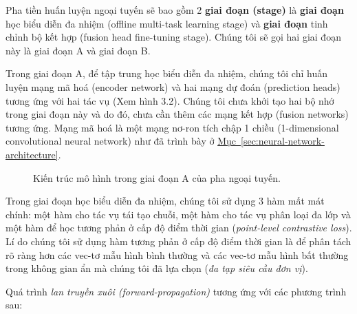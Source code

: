 Pha tiền huấn luyện ngoại tuyến sẽ bao gồm 2 \textbf{giai đoạn (stage)} là \textbf{giai đoạn} học biểu diễn đa nhiệm (offline multi-task learning stage) và \textbf{giai đoạn} tinh chỉnh bộ kết hợp (fusion head fine-tuning stage). Chúng tôi sẽ gọi hai giai đoạn này là giai đoạn A và giai đoạn B.

Trong giai đoạn A, để tập trung học biểu diễn đa nhiệm, chúng tôi chỉ huấn luyện mạng mã hoá (encoder network) và hai mạng dự đoán (prediction heads) tương ứng với hai tác vụ (Xem hình 3.2). Chúng tôi chưa khởi tạo hai bộ nhớ trong giai đoạn này và do đó, chưa cần thêm các mạng kết hợp (fusion networks) tương ứng. Mạng mã hoá là một mạng nơ-ron tích chập 1 chiều (1-dimensional convolutional neural network) như đã trình bày ở \hyperref[sec:neural-network-architecture]
{Mục~\ref*{sec:neural-network-architecture}}.

\begin{figure}[H]
    \centering
    
    \caption{Kiến trúc mô hình trong giai đoạn A của pha ngoại tuyến.}
    \label{fig:architecture-stage-A-offline-phase}
\end{figure}

Trong giai đoạn học biểu diễn đa nhiệm, chúng tôi sử dụng 3 hàm mất mát chính: một hàm cho tác vụ tái tạo chuỗi, một hàm cho tác vụ phân loại đa lớp và một hàm để học tương phản ở cấp độ điểm thời gian (\textit{point-level contrastive loss}). Lí do chúng tôi sử dụng hàm tương phản ở cấp độ điểm thời gian là để phân tách rõ ràng hơn các vec-tơ mẫu hình bình thường và các vec-tơ mẫu hình bất thường trong không gian ẩn mà chúng tôi đã lựa chọn (\textit{đa tạp siêu cầu đơn vị}).

Quá trình \textit{lan truyền xuôi (forward-propagation)} tương ứng với các phương trình sau:


